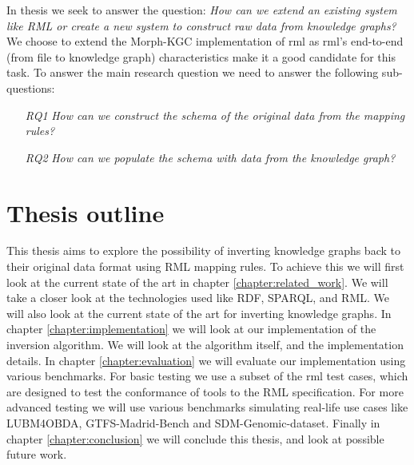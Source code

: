 In thesis we seek to answer the question: \textit{How can we extend an existing system like RML or create a new system to construct
raw data from knowledge graphs?} We choose to extend the Morph-KGC implementation \citep{arenas2022morph} of \acrshort{rml} \citep{dimou_ldow_2014} as \acrshort{rml}'s end-to-end (from file to knowledge graph) characteristics make it a good candidate for this task. To answer the main research question we need to answer the following sub-questions:
\begin{itemize}
    \item[\textit{RQ1}] \textit{How can we construct the schema of the original data from the mapping rules?}
    \item[\textit{RQ2}] \textit{How can we populate the schema with data from the knowledge graph?}
\end{itemize}

\section{Thesis outline}
This thesis aims to explore the possibility of inverting knowledge graphs back to their original data format using RML mapping rules. To achieve this we will first look at the current state of the art in chapter \ref{chapter:related_work}. We will take a closer look at the technologies used like RDF, SPARQL, and RML. We will also look at the current state of the art for inverting knowledge graphs. In chapter \ref{chapter:implementation} we will look at our implementation of the inversion algorithm. We will look at the algorithm itself, and the implementation details. In chapter \ref{chapter:evaluation} we will evaluate our implementation using various benchmarks. For basic testing we use a subset of the rml test cases, which are designed to test the conformance of tools to the RML specification. For more advanced testing we will use various benchmarks simulating real-life use cases like LUBM4OBDA, GTFS-Madrid-Bench and SDM-Genomic-dataset. Finally in chapter \ref{chapter:conclusion} we will conclude this thesis, and look at possible future work.

